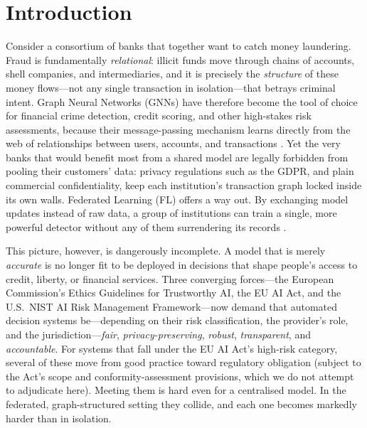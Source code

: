\documentclass[pdflatex,sn-mathphys-num]{sn-jnl}
\theoremstyle{thmstyleone}%
\theoremstyle{thmstyletwo}%
\theoremstyle{thmstylethree}%
\begin{document}
\maketitle

\section{Introduction}
\label{sec:intro}

\noindent Consider a consortium of banks that together want to catch money
laundering. Fraud is fundamentally \emph{relational}: illicit funds move through
chains of accounts, shell companies, and intermediaries, and it is precisely the
\emph{structure} of these money flows---not any single transaction in
isolation---that betrays criminal intent. Graph Neural Networks (GNNs) have
therefore become the tool of choice for financial crime detection, credit
scoring, and other high-stakes risk assessments, because their message-passing
mechanism learns directly from the web of relationships between users, accounts,
and transactions \cite{kipf2016semi,velickovic2017graph,dou2020enhancing}. Yet
the very banks that would benefit most from a shared model are legally forbidden
from pooling their customers' data: privacy regulations such as the GDPR, and
plain commercial confidentiality, keep each institution's transaction graph
locked inside its own walls. Federated Learning (FL) offers a way out. By
exchanging model updates instead of raw data, a group of institutions can train
a single, more powerful detector without any of them surrendering its records
\cite{mcmahan2017communication}.

This picture, however, is dangerously incomplete. A model that is merely
\emph{accurate} is no longer fit to be deployed in decisions that shape people's
access to credit, liberty, or financial services. Three converging forces---the
European Commission's Ethics Guidelines for Trustworthy AI, the EU AI Act, and
the U.S.\ NIST AI Risk Management Framework---now demand that automated
decision systems be---depending on their risk classification, the provider's
role, and the jurisdiction---\emph{fair}, \emph{privacy-preserving},
\emph{robust}, \emph{transparent}, and \emph{accountable}. For systems that fall
under the EU AI Act's high-risk category, several of these move from good
practice toward regulatory obligation (subject to the Act's scope and
conformity-assessment provisions, which we do not attempt to adjudicate here).
Meeting them is hard even for a centralised model. In the federated,
graph-structured setting they collide, and each one becomes markedly harder than
in isolation.
\end{document}
